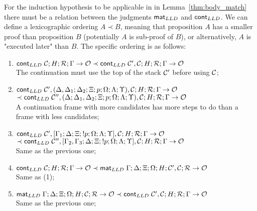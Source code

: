 For the induction hypothesis to be applicable in in Lemma~\ref{thm:body_match}
there must be a relation between the judgments $\mathsf{mat}_{LLD} \;$and $\mathsf{cont}_{LLD}$.  We can
define a lexicographic ordering $A \prec B$, meaning that proposition $A$ has a
smaller proof than proposition $B$ (potentially $A$ is sub-proof of $B$), or
alternatively, $A$ is "executed later" than $B$.  The specific ordering is as
follows:

\begin{enumerate}[leftmargin=*]
   \item $\mathsf{cont}_{LLD} \; \mathcal{C}; H; \mathcal{R}; \Gamma \rightarrow \mathcal{O} \prec
   \mathsf{cont}_{LLD} \; \mathcal{C'}, \mathcal{C}; H; \mathcal{R}; \Gamma \rightarrow \mathcal{O}$\\

   The continuation must use the top of the stack $\mathcal{C'}$ before using
   $\mathcal{C}$;

   \item $\mathsf{cont}_{LLD} \; \mathcal{C'}, (\Delta, \Delta_1; \Delta_2; \Xi; p; \Omega;
         \Lambda; \Upsilon), \mathcal{C}; H; \mathcal{R}; \Gamma \rightarrow \mathcal{O}$\\

   \hspace*{1cm}$\prec \mathsf{cont}_{LLD} \; \mathcal{C''}, (\Delta; \Delta_1, \Delta_2; \Xi; p;
         \Omega; \Lambda; \Upsilon), \mathcal{C}; H; \mathcal{R}; \Gamma \rightarrow \mathcal{O}$\\
   A continuation frame with more candidates has more steps to do than a frame with less candidates;

   \item $\mathsf{cont}_{LLD} \; \mathcal{C'}, [\Gamma_1; \Delta; \Xi; {!} p; \Omega; \Lambda;
   \Upsilon], \mathcal{C}; H; \mathcal{R}; \Gamma \rightarrow \mathcal{O}$\\
   \hspace*{1cm} $\prec \mathsf{cont}_{LLD} \; \mathcal{C''}, [\Gamma_2, \Gamma_3; \Delta; \Xi;
{!} p; \Omega; \Lambda; \Upsilon], \mathcal{C}; H; \mathcal{R}; \Gamma \rightarrow \mathcal{O}$\\
      Same as the previous one;

   \item $\mathsf{cont}_{LLD} \; \mathcal{C}; H; \mathcal{R}; \Gamma \rightarrow \mathcal{O} \prec \mathsf{mat}_{LLD} \;
   \Gamma; \Delta; \Xi; \Omega; H; \mathcal{C'}, \mathcal{C}; \mathcal{R}
   \rightarrow \mathcal{O}$\\ Same as (1);

   \item $\mathsf{mat}_{LLD} \; \Gamma; \Delta; \Xi; \Omega; H; \mathcal{C}; \mathcal{R} \rightarrow \mathcal{O} \prec
   \mathsf{cont}_{LLD} \; \mathcal{C'}, \mathcal{C}; H; \mathcal{R}; \Gamma \rightarrow \mathcal{O}$\\ Same as the previous one;


\end{enumerate}
